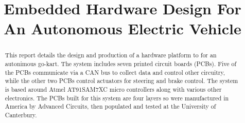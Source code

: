 \title{Embedded Hardware Design For An Autonomous Electric Vehicle}

\author{

  \vspace{0.5\baselineskip}


  \vspace{0.5\baselineskip}

}

\maketitle

\begin{abstract}
  This report details the design and production of a hardware platform to for
  an autonimous go-kart. The system includes seven printed circuit boards
  (PCBs).  Five of the PCBs communicate via a CAN bus to collect data and
  control other circuitry, while the other two PCBs control actuators for
  steering and brake control. The system is based around Atmel AT91SAM7XC micro
  controllers along with various other electronics. The PCBs built for this
  system  are four layers so were manufactured in America by Advanced Circuits,
  then populated and tested at the University of Canterbury.
\end{abstract}
